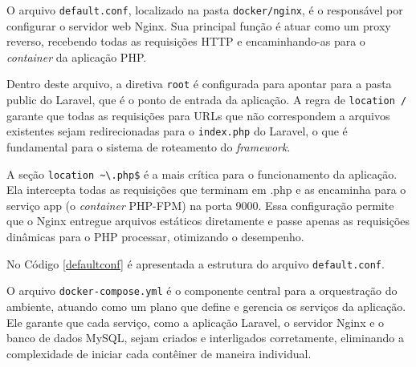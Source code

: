         

        \par O arquivo \texttt{default.conf}, localizado na pasta \texttt{docker/nginx}, é o responsável por configurar o servidor web Nginx. Sua principal função é atuar como um proxy reverso, recebendo todas as requisições HTTP e encaminhando-as para o \textit{container} da aplicação PHP.

        \par Dentro deste arquivo, a diretiva \texttt{root} é configurada para apontar para a pasta public do Laravel, que é o ponto de entrada da aplicação. A regra de \texttt{location /} garante que todas as requisições para URLs que não correspondem a arquivos existentes sejam redirecionadas para o \texttt{index.php} do Laravel, o que é fundamental para o sistema de roteamento do \textit{framework}.

        \par A seção \texttt{location \textasciitilde \textbackslash.php\$} é a mais crítica para o funcionamento da aplicação. Ela intercepta todas as requisições que terminam em .php e as encaminha para o serviço app (o \textit{container} PHP-FPM) na porta 9000. Essa configuração permite que o Nginx entregue arquivos estáticos diretamente e passe apenas as requisições dinâmicas para o PHP processar, otimizando o desempenho.

        \par No Código \ref{defaultconf} é apresentada a estrutura do arquivo \texttt{default.conf}.

        

        \par O arquivo \texttt{docker-compose.yml} é o componente central para a orquestração do ambiente, atuando como um plano que define e gerencia os serviços da aplicação. Ele garante que cada serviço, como a aplicação Laravel, o servidor Nginx e o banco de dados MySQL, sejam criados e interligados corretamente, eliminando a complexidade de iniciar cada contêiner de maneira individual.

